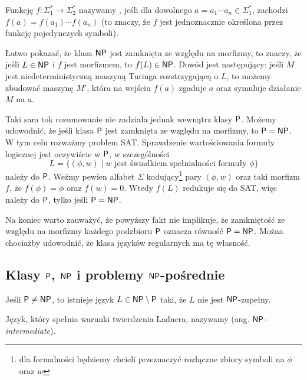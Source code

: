 \begin{remark}
    Funkcję $f : \Sigma_1^* \to \Sigma_2^*$ nazywamy , jeśli dla dowolnego $a = a_1 \cdots a_n \in \Sigma_1^*$, zachodzi $f(a) = f(a_1) \cdots f(a_n)$ (to znaczy, że $f$ jest jednoznacznie określona przez funkcję pojedynczych symboli).

    Łatwo pokazać, że klasa $\textsf{NP}$ jest zamknięta ze względu na morfizmy, to znaczy, że jeśli $L \in \textsf{NP}$ i $f$ jest morfizmem, to $f(L) \in \textsf{NP}$. Dowód jest następujący: jeśli $M$ jest niedeterministyczną maszyną Turinga rozstrzygającą o $L$, to możemy zbudować maszynę $M'$, która na wejściu $f(a)$ zgaduje $a$ oraz symuluje działanie $M$ na $a$.

    Taki sam tok rozumowanie nie zadziała jednak wewnątrz klasy $\textsf{P}$. Możemy udowodnić, że jeśli klasa $\textsf{P}$ jest zamknięta ze względu na morfizmy, to $\textsf{P} = \textsf{NP}$.
    W tym celu rozważmy problem SAT. Sprawdzenie wartościowania formuły logicznej jest oczywiście w $\textsf{P}$, w szczególności
    \[ L = \{(\phi, w) \mid w \text{ jest świadkiem spełnialności formuły } \phi \} \]
    należy do $\textsf{P}$. Weźmy pewien alfabet $\Sigma$ kodujący\footnote{dla formalności będziemy chcieli przeznaczyć rozłączne zbiory symboli na $\phi$ oraz $w$} pary $(\phi, w)$ oraz taki morfizm $f$, że $f(\phi) = \phi$ oraz $f(w) = 0$. Wtedy $f(L)$ redukuje się do SAT, więc należy do $\textsf{P}$, tylko jeśli $\textsf{P} = \textsf{NP}$.

    Na koniec warto zauważyć, że powyższy fakt nie implikuje, że zamkniętość ze względu na morfizmy każdego podzbioru $\textsf{P}$ oznacza równość $\textsf{P} = \textsf{NP}$. Można chociażby udowodnić, że klasa języków regularnych ma tę własność.
\end{remark}

\subsection{Klasy $\textsf{P}$, $\textsf{NP}$ i problemy $\textsf{NP}$-pośrednie}

\begin{theorem}[Ladnera]
    Jeśli $\textsf{P} \neq \textsf{NP}$, to istnieje język $L \in \textsf{NP} \setminus \textsf{P}$ taki, że $L$ nie jest $\textsf{NP}$-zupełny.
\end{theorem}

Język, który spełnia warunki twierdzenia Ladnera, nazywamy  (ang. \textit{$\textsf{NP}$-intermediate}).

